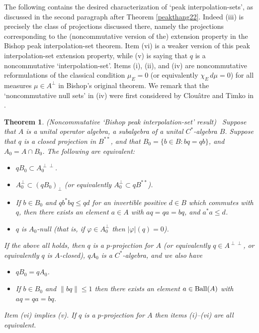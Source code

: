 \documentclass{amsart}
\newtheorem{theorem}{Theorem}[section]
\theoremstyle{remark}
\theoremstyle{definition}
\numberwithin{equation}{section}
\begin{document}
\bigskip

  

The following contains the desired characterization of `peak interpolation-sets', as discussed 
in the second paragraph after Theorem \ref{peakthang22}.  Indeed (iii) is precisely the class of projections
discussed there, namely the projections corresponding to the (noncommutative version of the) extension property in the Bishop peak interpolation-set theorem.  
Item (vi) is a weaker version of this peak interpolation-set  extension property,  while         (v) is saying that $q$ is a noncommutative `interpolation-set'. 
Items (i), (ii), and (iv) are noncommutative reformulations of the classical condition $\mu_E = 0$ (or equivalently $\chi_E \, d \mu = 0$) for all measures $\mu \in A^\perp$ in Bishop's original theorem.
 We remark that  the `noncommutative null sets' in   (iv)   were first considered by Clou\^atre and Timko in \cite{CT}.   




\begin{theorem} \label{peakthang}  {\rm (Noncommutative `Bishop peak interpolation-set' result)} \  Suppose that $A$ is a unital operator algebra, 
a subalgebra of a unital $C^*$-algebra $B$.
Suppose that  $q$ is a closed projection in $B^{**}$, and that 
 $B_0 = \{ b \in B : b q= qb \}$, and  $A_0 = A \cap B_0$.   The following are equivalent: 
\begin{itemize} \item [(i)] 
 $q B_0 \subset A_0^{\perp \perp}$.
 \item [(ii)] $A_0^{\perp} \subset (q B_0)_\perp$ 
 (or equivalently $A_0^{\perp} \subset q B^{**}$). 
 \item [(iii)]  If $b \in B_0$ 
 and $q b^* b q  \leq q d$ for an invertible positive $d \in B$ which commutes with $q$,
then  there exists an element $a \in A$ with $a q =  q a = b q$, and $a^* a \leq d$. 
 \item [(iv)]  $q$ is $A_0$-null (that is, if  $\varphi \in A_0^{\perp}$ then $|\varphi|(q) = 0$).
 \end{itemize} 
 If the above all holds, then $q$   is a $p$-projection for $A$ (or equivalently $q \in A^{\perp \perp}$, or equivalently $q$ is $A$-closed), $q A_0$ is a $C^*$-algebra,
 and we also have 
  \begin{itemize}   \item [(v)]   $q B_0 = q A_0$.
\item [(vi)] If $b \in B_0$ and $\| b q \|  \leq 1$ then  there exists an element $a \in {\rm Ball}(A)$ 
with $a q =  q a = b q$.
 \end{itemize} 
Item {\rm (vi)} implies {\rm (v)}.  If $q$   is a $p$-projection for $A$ then 
 items {\rm (i)}--{\rm (vi)} are all equivalent. \end{theorem}
\end{document}
